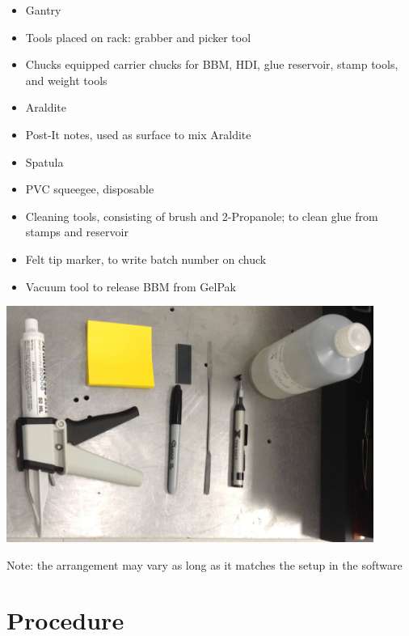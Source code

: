 \documentclass[12pt]{unlsilabsop}
\begin{document}
\begin{itemize}
    \item Gantry
    \item Tools placed on rack: grabber and picker tool
    \item Chucks equipped carrier chucks for BBM, HDI, glue reservoir, stamp tools, and weight tools
    \item Araldite
    \item Post-It notes, used as surface to mix Araldite
    \item Spatula
    \item PVC squeegee, disposable
    \item Cleaning tools, consisting of brush and 2-Propanole; to clean glue from stamps and reservoir
    \item Felt tip marker, to write batch number on chuck
    \item Vacuum tool to release BBM from GelPak
\end{itemize}
\begin{center}
\includegraphics[width=0.9\textwidth]{img/gluingMaterials.jpg}
\end{center}


Note: the arrangement may vary as long as it matches the setup in the software

\section{Procedure}
\end{document}
